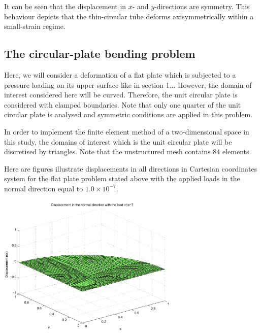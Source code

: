 It can be seen that the displacement in $ x $-\/ and $ y $-\/directions are symmetry. This behaviour depicts that the thin-\/circular tube deforms axisymmetrically within a small-\/strain regime.



\hypertarget{index_plate2}{}\subsection{The circular-\/plate bending problem}\label{index_plate2}
Here, we will consider a deformation of a flat plate which is subjected to a pressure loading on its upper surface like in section 1... However, the domain of interest considered here will be curved. Therefore, the unit circular plate is considered with clamped boundaries. Note that only one quarter of the unit circular plate is analysed and symmetric conditions are applied in this problem.

In order to implement the finite element method of a two-\/dimensional space in this study, the domains of interest which is the unit circular plate will be discretised by triangles. Note that the unstructured mesh contains 84 elements.

Here are figures illustrate displacements in all directions in Cartesian coordinates system for the flat plate problem stated above with the applied loads in the normal direction equal to $ 1.0\times 10^{-7} $.

 
\begin{DoxyImage}
\includegraphics[width=0.65\textwidth]{Cir_Plate_x_direction}
\end{DoxyImage}


